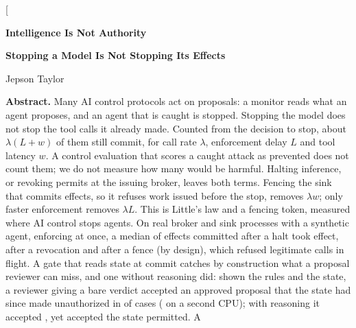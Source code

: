 \makeatletter
\twocolumn[\begin{@twocolumnfalse}
\thispagestyle{plain}
\begin{center}
{\fontsize{22}{26}\selectfont\bfseries\color{ink}Intelligence Is {\color{notred}Not} Authority\par}
\vspace{4pt}
{\normalsize\bfseries\color{slate}Stopping a Model Is Not Stopping Its Effects\par}
\vspace{5pt}
{\normalsize Jepson Taylor\enspace\textperiodcentered\enspace{\small\color{slate}\paperdate}\par}
\end{center}
\vspace{2pt}
\begin{center}\begin{minipage}{.96\textwidth}\small
\textbf{Abstract.}\enspace
Many AI control protocols act on proposals: a monitor reads what an agent proposes, and an agent that is caught is
stopped. Stopping the model does not stop the tool calls it already made. Counted from the decision to stop, about
\(\lambda(L+w)\) of them still commit, for call rate \(\lambda\), enforcement delay \(L\) and tool latency \(w\). A
control evaluation that scores a caught attack as prevented does not count them; we do not measure how many would be
harmful. Halting inference, or revoking permits at the issuing broker, leaves both terms. Fencing the sink that
commits effects, so it refuses work issued before the stop, removes \(\lambda w\); only faster enforcement removes
\(\lambda L\). This is Little's law and a fencing token, measured where AI control stops agents. On real broker and
sink processes with a synthetic agent, enforcing at once, a median of \vsixPhaseHaltMedian{} effects committed after a
halt took effect, \vsixPhaseRevokeMedian{} after a revocation and \vsixPhaseFenceRange{} after a fence (by design),
which refused \vsixPhaseFenceLostMedian{} legitimate calls in flight. A gate that reads state at commit
catches by construction what a proposal reviewer can miss, and one without reasoning did: shown the
rules and the state, a \vsixEFiveCkpt{} reviewer giving a bare verdict accepted an approved proposal that the state had
since made unauthorized in \vsixReviewerExact{} of \vsixExactCases{} cases (\vsixEFiveCROneSecondHost{} on a second
CPU); with reasoning it accepted \vsixReasonerExact{}, yet accepted \vsixEFiveCTwinsPhrase{} the state permitted. A

\end{minipage}
\end{center}
\end{@twocolumnfalse}
